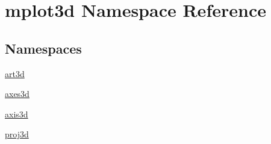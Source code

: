 \hypertarget{namespacemplot3d}{}\section{mplot3d Namespace Reference}
\label{namespacemplot3d}
\subsection*{Namespaces}
\begin{DoxyCompactItemize}
\item 
 \hyperlink{namespacemplot3d_1_1art3d}{art3d}
\item 
 \hyperlink{namespacemplot3d_1_1axes3d}{axes3d}
\item 
 \hyperlink{namespacemplot3d_1_1axis3d}{axis3d}
\item 
 \hyperlink{namespacemplot3d_1_1proj3d}{proj3d}
\end{DoxyCompactItemize}

